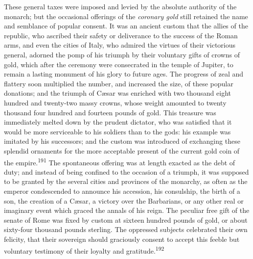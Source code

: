 



These general taxes were imposed and levied by the absolute
authority of the monarch; but the occasional offerings of the
\textit{coronary gold} still retained the name and semblance of popular
consent. It was an ancient custom that the allies of the
republic, who ascribed their safety or deliverance to the success
of the Roman arms, and even the cities of Italy, who admired the
virtues of their victorious general, adorned the pomp of his
triumph by their voluntary gifts of crowns of gold, which after
the ceremony were consecrated in the temple of Jupiter, to remain
a lasting monument of his glory to future ages. The progress of
zeal and flattery soon multiplied the number, and increased the
size, of these popular donations; and the triumph of Cæsar was
enriched with two thousand eight hundred and twenty-two massy
crowns, whose weight amounted to twenty thousand four hundred and
fourteen pounds of gold. This treasure was immediately melted
down by the prudent dictator, who was satisfied that it would be
more serviceable to his soldiers than to the gods: his example
was imitated by his successors; and the custom was introduced of
exchanging these splendid ornaments for the more acceptable
present of the current gold coin of the empire.\textsuperscript{191} The
spontaneous offering was at length exacted as the debt of duty;
and instead of being confined to the occasion of a triumph, it
was supposed to be granted by the several cities and provinces of
the monarchy, as often as the emperor condescended to announce
his accession, his consulship, the birth of a son, the creation
of a Cæsar, a victory over the Barbarians, or any other real or
imaginary event which graced the annals of his reign. The
peculiar free gift of the senate of Rome was fixed by custom at
sixteen hundred pounds of gold, or about sixty-four thousand
pounds sterling. The oppressed subjects celebrated their own
felicity, that their sovereign should graciously consent to
accept this feeble but voluntary testimony of their loyalty and
gratitude.\textsuperscript{192}

